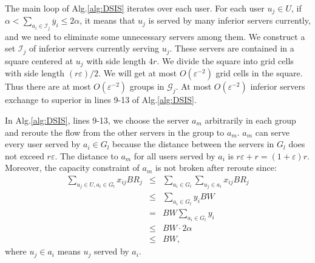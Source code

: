 \documentclass[journal]{IEEEtran}
\begin{document}
The main loop of Alg.\ref{alg:DSIS} iterates over each user. For each user $u_j\in U$, if $\alpha < \sum\nolimits_{{a_i} \in \mathcal{I}_j} {{{\overline y }_i}}  \le 2\alpha $, it means that $u_j$ is served by many inferior servers currently, and we need to eliminate some unnecessary servers among them. We construct a set $\mathcal{I}_j$ of inferior servers currently serving $u_j$. These servers are contained in a square centered at $u_j$ with side length $4r$. We divide the square into grid cells with side length $(r\varepsilon)/2$. We will get at most $O(\varepsilon^{-2})$ grid cells in the square. Thus there are at most $O(\varepsilon^{-2})$ groups in $\mathcal{G}_j$. At most $O( \varepsilon^{-2})$ inferior servers exchange to superior in lines 9-13 of Alg.\ref{alg:DSIS}.


In Alg.\ref{alg:DSIS}, lines 9-13, we choose the server $a_m$ arbitrarily in each group and reroute the flow from the other servers in the group to $a_m$. $a_m$ can serve every user served by $a_i \in G_l $ because the distance between the servers in $G_l$ does not exceed $r\varepsilon$. The distance to $a_m$ for all users served by $a_i$ is $r\varepsilon + r = (1+\varepsilon)r $. Moreover, the capacity constraint of $a_m$ is not broken after reroute since:
\begin{eqnarray*}
	\sum\limits_{u_j \in U, a_i \in G_l} {x_{ij}BR_j} &\le&\sum\limits_{a_i\in G_l} {\sum\limits_{u_j \in a_i} {x_{ij}BR_j}}\\
	&\le&\sum\limits_{a_i\in G_l} {y_i BW}\\
	&=&BW\sum\limits_{a_i\in G_l} {y_i} \\
	&\le&BW \cdot 2 \alpha\\
	&\le&BW,
\end{eqnarray*}
where $u_j\in a_i$ means $u_j$ served by $a_i$.
\end{document}

